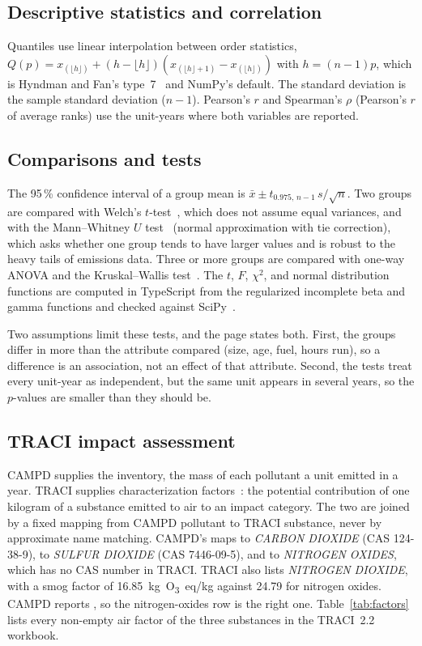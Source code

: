 \documentclass[11pt,a4paper]{article}
\begin{document}
\subsection{Descriptive statistics and correlation}

Quantiles use linear interpolation between order statistics, $Q(p) = x_{(\lfloor h\rfloor)} +
(h - \lfloor h\rfloor)(x_{(\lfloor h\rfloor + 1)} - x_{(\lfloor h\rfloor)})$ with $h = (n-1)p$,
which is Hyndman and Fan's type~7~\cite{hyndman1996quantiles} and NumPy's default. The standard
deviation is the sample standard deviation ($n - 1$). Pearson's $r$ and Spearman's $\rho$
(Pearson's $r$ of average ranks) use the unit-years where both variables are reported.

\subsection{Comparisons and tests}

The 95\,\% confidence interval of a group mean is $\bar{x} \pm t_{0.975,\,n-1}\, s/\sqrt{n}$.
Two groups are compared with Welch's $t$-test~\cite{welch1947}, which does not assume equal
variances, and with the Mann--Whitney $U$ test~\cite{mann1947} (normal approximation with tie
correction), which asks whether one group tends to have larger values and is robust to the
heavy tails of emissions data. Three or more groups are compared with one-way ANOVA and the
Kruskal--Wallis test~\cite{kruskal1952}. The $t$, $F$, $\chi^2$, and normal distribution
functions are computed in TypeScript from the regularized incomplete beta and gamma functions
and checked against SciPy~\cite{virtanen2020scipy}.

Two assumptions limit these tests, and the page states both. First, the groups differ in more
than the attribute compared (size, age, fuel, hours run), so a difference is an association, not
an effect of that attribute. Second, the tests treat every unit-year as independent, but the
same unit appears in several years, so the $p$-values are smaller than they should be.

\subsection{TRACI impact assessment}
\label{sec:traci}

CAMPD supplies the inventory, the mass of each pollutant a unit emitted in a year. TRACI supplies
characterization factors~\cite{bare2011traci,epa2022traci22}: the potential contribution of one
kilogram of a substance emitted to air to an impact category. The two are joined by a fixed
mapping from CAMPD pollutant to TRACI substance, never by approximate name matching. CAMPD's
\COtwo{} maps to \emph{CARBON DIOXIDE} (CAS 124-38-9), \SOtwo{} to \emph{SULFUR DIOXIDE} (CAS
7446-09-5), and \NOx{} to \emph{NITROGEN OXIDES}, which has no CAS number in TRACI. TRACI also
lists \emph{NITROGEN DIOXIDE}, with a smog factor of 16.85~kg~O\textsubscript{3}~eq/kg against
24.79 for nitrogen oxides. CAMPD reports \NOx{}, so the nitrogen-oxides row is the right one.
Table~\ref{tab:factors} lists every non-empty air factor of the three substances in the TRACI~2.2
workbook.
\end{document}
